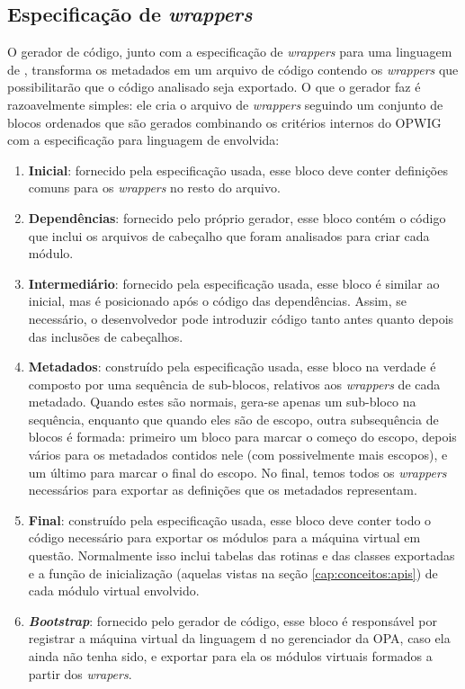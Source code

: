  \subsection{Especificação de \textit{wrappers}}
  O gerador de código, junto com a especificação de \textit{wrappers} para uma linguagem
  de \script{}, transforma os metadados em um arquivo de código \CXX{} contendo os
  \textit{wrappers} que possibilitarão que o código analisado seja exportado. O que o
  gerador faz é razoavelmente simples: ele cria o arquivo de \textit{wrappers} seguindo
  um conjunto de blocos ordenados que são gerados combinando os critérios
  internos do OPWIG com a especificação para linguagem de \script{} envolvida:
  \begin{enumerate}
    \item \textbf{Inicial}: fornecido pela especificação usada, esse bloco deve conter
      definições comuns para os \textit{wrappers} no resto do arquivo.
    \item \textbf{Dependências}: fornecido pelo próprio gerador, esse bloco contém o código
      que inclui os arquivos de cabeçalho que foram analisados para criar cada módulo.
    \item \textbf{Intermediário}: fornecido pela especificação usada, esse bloco é similar ao 
      inicial, mas é posicionado após o código das dependências. Assim, se necessário,
      o desenvolvedor pode introduzir código tanto antes quanto depois das inclusões de cabeçalhos.
    \item \textbf{Metadados}: construído pela especificação usada, esse bloco na verdade é
      composto por uma sequência de sub-blocos, relativos aos \textit{wrappers} de cada
      metadado. Quando estes são normais, gera-se apenas um sub-bloco na sequência, enquanto
      que quando eles são de escopo, outra subsequência de blocos é formada: primeiro um
      bloco para marcar o começo do escopo, depois vários para os metadados contidos
      nele (com possivelmente mais escopos), e um último para marcar o final do
      escopo. No final, temos todos os \textit{wrappers} necessários para exportar
      as definições que os metadados representam.
    \item \textbf{Final}: construído pela especificação usada, esse bloco deve conter
      todo o código necessário para exportar os módulos para a máquina virtual em questão.
      Normalmente isso inclui tabelas das rotinas e das classes exportadas e a
      função de inicialização (aquelas vistas na seção \ref{cap:conceitos:apis}) de
      cada módulo virtual envolvido.
    \item \textbf{\textit{Bootstrap}}: fornecido pelo gerador de código, esse
      bloco é responsável por registrar a máquina virtual da linguagem d
      \script{} no gerenciador da OPA, caso ela ainda não tenha sido, e exportar
      para ela os módulos virtuais formados a partir dos \textit{wrapers}.
  \end{enumerate}
  

